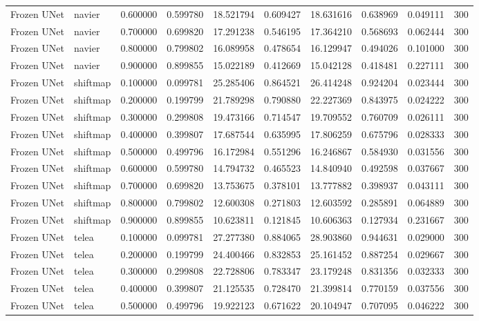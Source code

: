 \begin{table}[h]
\begin{tabular}{llrrrrrrrr}
Frozen UNet & navier & 0.600000 & 0.599780 & 18.521794 & 0.609427 & 18.631616 & 0.638969 & 0.049111 & 300 \\
Frozen UNet & navier & 0.700000 & 0.699820 & 17.291238 & 0.546195 & 17.364210 & 0.568693 & 0.062444 & 300 \\
Frozen UNet & navier & 0.800000 & 0.799802 & 16.089958 & 0.478654 & 16.129947 & 0.494026 & 0.101000 & 300 \\
Frozen UNet & navier & 0.900000 & 0.899855 & 15.022189 & 0.412669 & 15.042128 & 0.418481 & 0.227111 & 300 \\
Frozen UNet & shiftmap & 0.100000 & 0.099781 & 25.285406 & 0.864521 & 26.414248 & 0.924204 & 0.023444 & 300 \\
Frozen UNet & shiftmap & 0.200000 & 0.199799 & 21.789298 & 0.790880 & 22.227369 & 0.843975 & 0.024222 & 300 \\
Frozen UNet & shiftmap & 0.300000 & 0.299808 & 19.473166 & 0.714547 & 19.709552 & 0.760709 & 0.026111 & 300 \\
Frozen UNet & shiftmap & 0.400000 & 0.399807 & 17.687544 & 0.635995 & 17.806259 & 0.675796 & 0.028333 & 300 \\
Frozen UNet & shiftmap & 0.500000 & 0.499796 & 16.172984 & 0.551296 & 16.246867 & 0.584930 & 0.031556 & 300 \\
Frozen UNet & shiftmap & 0.600000 & 0.599780 & 14.794732 & 0.465523 & 14.840940 & 0.492598 & 0.037667 & 300 \\
Frozen UNet & shiftmap & 0.700000 & 0.699820 & 13.753675 & 0.378101 & 13.777882 & 0.398937 & 0.043111 & 300 \\
Frozen UNet & shiftmap & 0.800000 & 0.799802 & 12.600308 & 0.271803 & 12.603592 & 0.285891 & 0.064889 & 300 \\
Frozen UNet & shiftmap & 0.900000 & 0.899855 & 10.623811 & 0.121845 & 10.606363 & 0.127934 & 0.231667 & 300 \\
Frozen UNet & telea & 0.100000 & 0.099781 & 27.277380 & 0.884065 & 28.903860 & 0.944631 & 0.029000 & 300 \\
Frozen UNet & telea & 0.200000 & 0.199799 & 24.400466 & 0.832853 & 25.161452 & 0.887254 & 0.029667 & 300 \\
Frozen UNet & telea & 0.300000 & 0.299808 & 22.728806 & 0.783347 & 23.179248 & 0.831356 & 0.032333 & 300 \\
Frozen UNet & telea & 0.400000 & 0.399807 & 21.125535 & 0.728470 & 21.399814 & 0.770159 & 0.037556 & 300 \\
Frozen UNet & telea & 0.500000 & 0.499796 & 19.922123 & 0.671622 & 20.104947 & 0.707095 & 0.046222 & 300 \\

\end{tabular}
\end{table}
